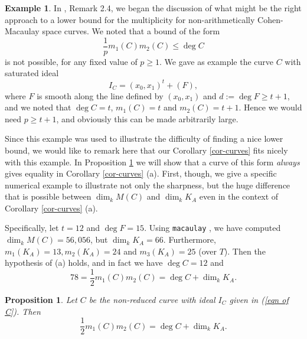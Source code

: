 \documentclass[12pt,twoside]{amsart}
\numberwithin{equation}{section}
\newtheorem{proposition}[theorem]{Proposition}
\theoremstyle{definition}
\newtheorem{example}[theorem]{Example}
\begin{document}
\begin{example} \label{sharp ex from MNR}
In \cite{MNR}, Remark 2.4, we began the discussion of what might be the right
approach to a lower bound for the multiplicity for non-arithmetically
Cohen-Macaulay space curves.  We noted that a bound of the form
\[
\frac{1}{p} m_1(C) m_2(C) \leq \deg C
\]
is not possible, for any fixed value of $p \geq 1$.  We gave as example the curve $C$
with saturated ideal
\begin{equation} \label{eqn of C}
I_C = (x_0,x_1)^t + (F),
\end{equation}
where $F$ is smooth along the line defined by $(x_0,x_1)$ and $d := \deg F \geq t+1$, and
we noted that $\deg C = t$,  $m_1(C) = t$ and $m_2(C) = t+1$.  Hence we would need $p
\geq t+1$, and obviously this can be made arbitrarily large.

Since this example was used to illustrate the difficulty of finding a nice lower bound,
we would like to remark here that our Corollary \ref{cor-curves} fits nicely with this
example.  In Proposition \ref{sharp ex} we will show that a curve of this form {\em
always} gives equality in Corollary \ref{cor-curves} (a).  First, though, we give a
specific numerical example to illustrate not only the sharpness, but the huge difference
that is possible between $\dim_k M(C)$ and $\dim_k K_A$ even in the context of Corollary
\ref{cor-curves} (a).


Specifically, let $t=12$ and $\deg F = 15$. Using {\tt macaulay} \cite{macaulay}, we have
computed $\dim_k M(C) = 56,056$, but $\dim_k K_A = 66$.  Furthermore, $m_1(K_A) = 13,
m_2(K_A) = 24$ and $m_3(K_A) = 25$ (over $T$).  Then the hypothesis of (a) holds, and in
fact we have $\deg C = 12$ and
\[
78 = \frac{1}{2} m_1(C) m_2(C) = \deg C + \dim_k K_A.
\]
\end{example}

\begin{proposition} \label{sharp ex}
Let $C$ be the non-reduced curve with ideal $I_C$ given in (\ref{eqn of C}).
Then
\[
\frac{1}{2} m_1(C) m_2(C) = \deg C + \dim_k K_A.
\]
\end{proposition}
\end{document}
